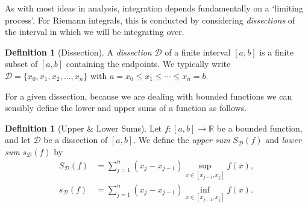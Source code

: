 \documentclass[11pt, a4paper]{article}
\theoremstyle{definition}
\newtheorem{definition}[theorem]{Definition}
\newcommand{\vocab}[1]{\emph{#1}} %
\newcommand{\R}{\mathbb{R}}
\newcommand{\DD}{\mathcal{D}}
\begin{document}
As with most ideas in analysis, integration depends fundamentally on a `limiting process'. For Riemann integrals, this is conducted by considering \emph{dissections} of the interval in which we will be integrating over.

\begin{definition}[Dissection]
	A \vocab{dissection} $\DD$ of a finite interval $[a, b]$ is a finite subset of $[a, b]$ containing the endpoints. We typically write $\DD = \{x_0, x_1, x_2, \dots, x_n\}$ with $a = x_0 \leq x_1 \leq \cdots \leq x_n = b$.
\end{definition}

For a given dissection, because we are dealing with bounded functions we can sensibly define the lower and upper sums of a function as follows.

\begin{definition}[Upper \& Lower Sums]
	Let $f: [a, b] \rightarrow \R$ be a bounded function, and let $\DD$ be a dissection of $[a, b]$. We define the \vocab{upper sum} $S_{\DD}(f)$ and \vocab{lower sum} $s_{\DD}(f)$ by
	\begin{align*}
		S_{\DD}(f) &= \sum_{j = 1}^n (x_j - x_{j - 1}) \sup_{x \in [x_{j - 1}, x_j]} f(x), \\
		s_{\DD}(f) &= \sum_{j = 1}^n (x_j - x_{j - 1}) \inf_{x \in [x_{j - 1}, x_j]} f(x).
	\end{align*}
\end{definition}


\end{document}
